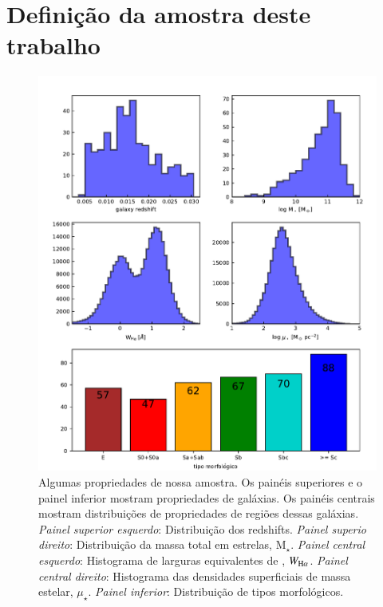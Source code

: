 \section{Definição da amostra deste trabalho}
\label{sec:sample:definicao}
\begin{figure}
	\centering
	\includegraphics[scale=0.9]{figuras/fig_sample_tese2.pdf}
	\caption[Amostra]
	{Algumas propriedades de nossa amostra. Os painéis superiores e o painel inferior mostram propriedades de galáxias. Os painéis centrais mostram distribuições de propriedades de regiões dessas galáxias. {\em Painel superior esquerdo}: Distribuição dos redshifts. {\em Painel superio direito}: Distribuição da massa total em estrelas, M$_\star$. {\em Painel central esquerdo}: Histograma de larguras equivalentes de \Ha, $W_{\Ha}$. {\em Painel central direito}: Histograma das densidades superficiais de massa estelar, $\mu_\star$. {\em Painel inferior}: Distribuição de tipos morfológicos.}
	\label{fig:sample}
\end{figure}

